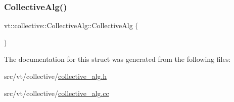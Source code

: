 \subsubsection{\texorpdfstring{Collective\+Alg()}{CollectiveAlg()}}
{\footnotesize\ttfamily vt\+::collective\+::\+Collective\+Alg\+::\+Collective\+Alg (\begin{DoxyParamCaption}{ }\end{DoxyParamCaption})}



The documentation for this struct was generated from the following files\+:\begin{DoxyCompactItemize}
\item 
src/vt/collective/\hyperlink{collective__alg_8h}{collective\+\_\+alg.\+h}\item 
src/vt/collective/\hyperlink{collective__alg_8cc}{collective\+\_\+alg.\+cc}\end{DoxyCompactItemize}
